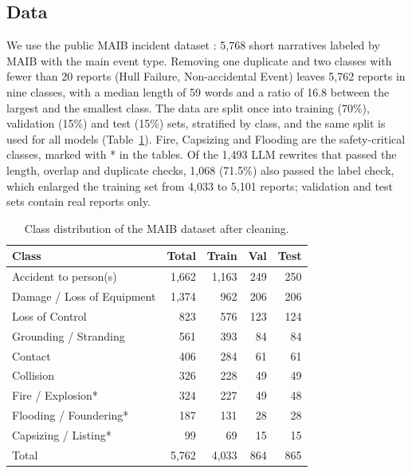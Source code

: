 \documentclass[conference]{IEEEtran}
\begin{document}
\subsection{Data}

We use the public MAIB incident dataset \cite{munaev2025maib}: 5,768 short narratives labeled by MAIB with the main event type. Removing one duplicate and two classes with fewer than 20 reports (Hull Failure, Non-accidental Event) leaves 5,762 reports in nine classes, with a median length of 59 words and a ratio of 16.8 between the largest and the smallest class. The data are split once into training (70\%), validation (15\%) and test (15\%) sets, stratified by class, and the same split is used for all models (Table~\ref{tab:data}). Fire, Capsizing and Flooding are the safety-critical classes, marked with * in the tables. Of the 1,493 LLM rewrites that passed the length, overlap and duplicate checks, 1,068 (71.5\%) also passed the label check, which enlarged the training set from 4,033 to 5,101 reports; validation and test sets contain real reports only.

\begin{table}[t]
\caption{Class distribution of the MAIB dataset after cleaning.}
\label{tab:data}
\centering
\footnotesize
\begin{tabular}{lrrrr}
\toprule
Class & Total & Train & Val & Test \\
\midrule
Accident to person(s) & 1,662 & 1,163 & 249 & 250 \\
Damage / Loss of Equipment & 1,374 & 962 & 206 & 206 \\
Loss of Control & 823 & 576 & 123 & 124 \\
Grounding / Stranding & 561 & 393 & 84 & 84 \\
Contact & 406 & 284 & 61 & 61 \\
Collision & 326 & 228 & 49 & 49 \\
Fire / Explosion* & 324 & 227 & 49 & 48 \\
Flooding / Foundering* & 187 & 131 & 28 & 28 \\
Capsizing / Listing* & 99 & 69 & 15 & 15 \\
\midrule
Total & 5,762 & 4,033 & 864 & 865 \\
\bottomrule
\end{tabular}
\end{table}
\end{document}
